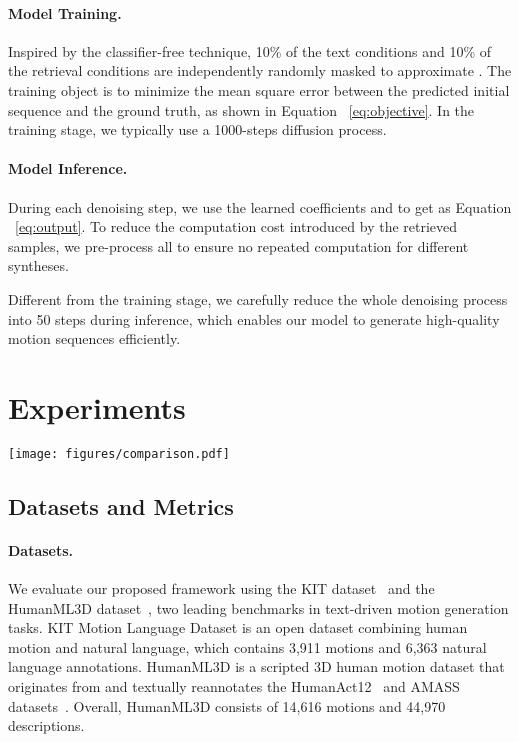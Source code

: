 \documentclass[10pt,twocolumn,letterpaper]{article}
\newcommand{\name}{ReMoDiffuse\xspace}
\begin{document}
\paragraph{Model Training.} 
Inspired by the classifier-free technique, 10\% of the text conditions and 10\% of the retrieval conditions are independently randomly masked to approximate . The training object is to minimize the mean square error between the predicted initial sequence and the ground truth, as shown in Equation ~\ref{eq:objective}. In the training stage, we typically use a 1000-steps diffusion process.




\paragraph{Model Inference.} 

During each denoising step, we use the learned coefficients  and  to get  as Equation ~\ref{eq:output}. To reduce the computation cost introduced by the retrieved samples, we pre-process all  to ensure no repeated computation for different syntheses.

Different from the training stage, we carefully reduce the whole denoising process into 50 steps during inference, which enables our model to generate high-quality motion sequences efficiently.
 \section{Experiments}
\begin{figure*}[ht]
    \centering
    \texttt{[image: figures/comparison.pdf]}
    \caption{Visual Comparison between previous works and \name. We draw black lines to show the translation path. As for both given conditions, only \name conveys accurate action and path condition.}
    \label{fig:comparison}
\end{figure*}

\subsection{Datasets and Metrics}
\paragraph{Datasets.} We evaluate our proposed framework using the KIT dataset~\cite{plappert2016kit} and the HumanML3D dataset~\cite{guo2022generating}, two leading benchmarks in text-driven motion generation tasks. KIT Motion Language Dataset is an open dataset combining human motion and natural language, which contains 3,911 motions and 6,363 natural language annotations. HumanML3D is a scripted 3D human motion dataset that originates from and textually reannotates the HumanAct12~\cite{guo2020action2motion} and AMASS datasets~\cite{mahmood2019amass}. Overall, HumanML3D consists of 14,616 motions and 44,970 descriptions.
\end{document}
